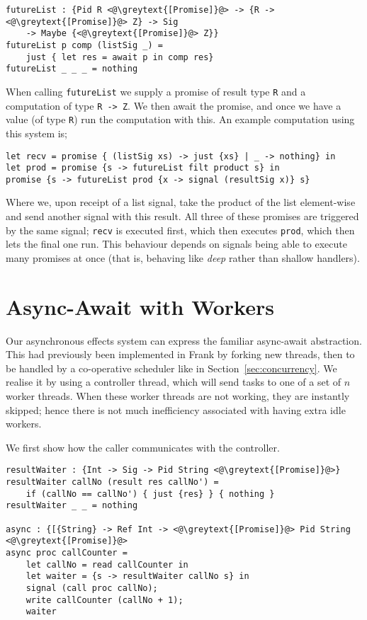 \documentclass[msc,deptreport,cs]{infthesis} %
\newcommand{\code}[1]{\lstinline{#1}}
\newcommand{\greytext}[1]{\textcolor{black!40}{#1}}
\begin{document}
\begin{lstlisting}
futureList : {Pid R <@\greytext{[Promise]}@> -> {R -> <@\greytext{[Promise]}@> Z} -> Sig
    -> Maybe {<@\greytext{[Promise]}@> Z}}
futureList p comp (listSig _) =
    just { let res = await p in comp res}
futureList _ _ _ = nothing
\end{lstlisting}

\noindent When calling \code{futureList} we supply a promise of result type
\code{R} and a computation of type \code{R -> Z}. We then await the promise, and
once we have a value (of type \code{R}) run the computation with this. An
example computation using this system is;

\begin{lstlisting}
let recv = promise { (listSig xs) -> just {xs} | _ -> nothing} in
let prod = promise {s -> futureList filt product s} in
promise {s -> futureList prod {x -> signal (resultSig x)} s}
\end{lstlisting}

\noindent Where we, upon receipt of a list signal, take the product of the list
element-wise and send another signal with this result. All three of these
promises are triggered by the same signal; \code{recv} is executed first, which
then executes \code{prod}, which then lets the final one run. This behaviour
depends on signals being able to execute many promises at once (that is,
behaving like \emph{deep} rather than shallow handlers).

\section{Async-Await with Workers}

Our asynchronous effects system can express the familiar async-await
abstraction. This had previously been implemented in Frank by forking new
threads, then to be handled by a co-operative scheduler like in
Section~\ref{sec:concurrency}. We realise it by using a controller thread, which
will send tasks to one of a set of $n$ worker threads. When these worker threads
are not working, they are instantly skipped; hence there is not much
inefficiency associated with having extra idle workers.

We first show how the caller communicates with the controller.

\begin{lstlisting}
resultWaiter : {Int -> Sig -> Pid String <@\greytext{[Promise]}@>}
resultWaiter callNo (result res callNo') =
    if (callNo == callNo') { just {res} } { nothing }
resultWaiter _ _ = nothing

async : {[{String} -> Ref Int -> <@\greytext{[Promise]}@> Pid String <@\greytext{[Promise]}@>
async proc callCounter =
    let callNo = read callCounter in
    let waiter = {s -> resultWaiter callNo s} in
    signal (call proc callNo);
    write callCounter (callNo + 1);
    waiter
\end{lstlisting}
\end{document}

